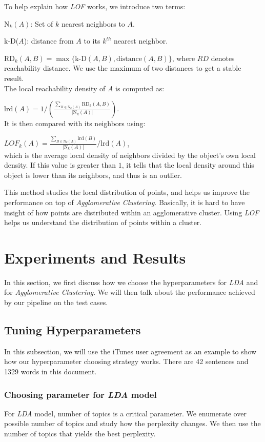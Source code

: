 \documentclass[conference,compsoc]{IEEEtran}
\begin{document}
  To help explain how \emph{LOF} works, we introduce two terms:

  $\text{N}_k(A)$: Set of $k$ nearest neighbors to $A$. 

  k-D($A$): distance from $A$ to its $k^{th}$ nearest neighbor. 

  $\text{RD}_k (A,B) = \max \{ \text{k-D} (A,B), \text{distance}(A,B) \}$, where $RD$ denotes reachability distance. We use the maximum of two distances to get a stable result. \\

  The local reachability density of $A$ is computed as: 

  $\text{lrd}(A) = 1 / (\frac{\sum_{B\in \text{N}_k(A)} \text{RD}_k(A,B)}{|\text{N}_k(A)|})$. \\
  It is then compared with its neighbors using: 

  $LOF_k(A) = \frac{\sum_{B \in \text{N}_k(A)} \text{lrd}(B) }{|\text{N}_k(A)|} / \text{lrd}(A)$, \\
  which is the average local density of neighbors divided by the object's own local density. If this value is greater than $1$, it tells that the local density around this object is lower than its neighbors, and thus is an outlier. 

  This method studies the local distribution of points, and helps us improve the performance on top of \emph{Agglomerative Clustering}. Basically, it is hard to have insight of how points are distributed within an agglomerative cluster. Using \emph{LOF} helps us understand the distribution of points within a cluster. 

\section{Experiments and Results}
  In this section, we first discuss how we choose the hyperparameters for \emph{LDA} and for \emph{Agglomerative Clustering}. We will then talk about the performance achieved by our pipeline on the test cases.

  \subsection{Tuning Hyperparameters}
  In this subsection, we will use the iTunes user agreement as an example to show how our hyperparameter choosing strategy works. There are 42 sentences and 1329 words in this document. 

  \subsubsection{Choosing parameter for \emph{LDA} model}
  For \emph{LDA} model, number of topics is a critical parameter. We enumerate over possible number of topics and study how the perplexity changes. We then use the number of topics that yields the best perplexity. 
\end{document}
